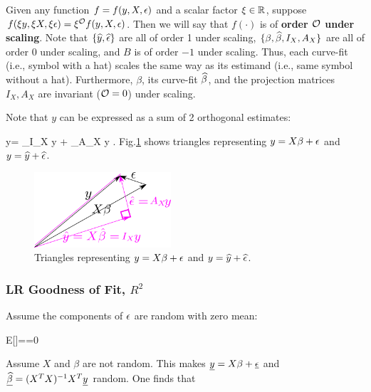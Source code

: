 Given any function $f=f(y,X,\epsilon)$
and a scalar factor $\xi\in { \mathbb{R}}$,
suppose
$f(\xi y, \xi X, \xi\epsilon)=\xi^{\cal O} f(y,X,\epsilon)$.
Then we will say that $f(\cdot)$
is of {\bf order ${\cal O}$ under scaling}.
Note that $\{{\widehat{y}},
 {\widehat{\epsilon}}\}$
are all of order 1 under scaling,
$\{\beta, {\widehat{\beta}}, I_X, A_X\}$
are all of order 0 under scaling,
and $B$ is of order $-1$ under scaling.
Thus, each curve-fit (i.e., symbol
with a hat)
scales the same way as its estimand (i.e., same
symbol
without a hat). Furthermore,
$\beta$, its curve-fit ${\widehat{\beta}}$, and
the projection matrices $I_X, A_X$
are invariant (${\cal O}=0$) under scaling.



Note that $y$
can be expressed as
a sum of 2 orthogonal estimates:



\beq
y= _{I_X y} +
\underbrace{\HAT{\eps}}_{A_X y}
\;.
\eeq
Fig.\ref{fig-lin-reg-vecs}
shows triangles representing
$y=X\beta+\epsilon$ and $y={\widehat{y}}+{\widehat{\epsilon}}$.


\begin{figure}[h!]
\centering
\includegraphics[width=2in]
{conventions/lin-reg-vecs.png}
\caption{Triangles
representing
$y=X\beta+\epsilon$ and $y={\widehat{y}}+{\widehat{\epsilon}}$.}
\label{fig-lin-reg-vecs}
\end{figure}

\subsubsection{LR Goodness of Fit, $R^2$}


Assume the components of $\epsilon$
are random with zero mean:

\beq
E[\rveps]=\av{\rveps}=0
\eeq



Assume $X$ and $\beta$ are not random.
This makes ${\underline{y}}=X\beta +\underline{\epsilon}$ and $\underline{{\widehat{\beta}}}=
(X^TX)^{-1}X^T{\underline{y}}
$
random.
One finds that

